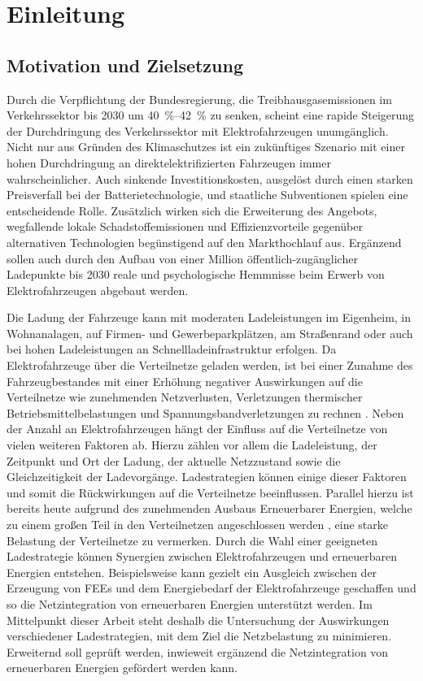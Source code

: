 \section{Einleitung}


\subsection{Motivation und Zielsetzung}

Durch die Verpflichtung der Bundesregierung, die Treibhausgasemissionen im Verkehrssektor bis \num{2030} um \SIrange[range-phrase=~bis~]{40}{42}{\percent} \cite{BundesministeriumUmwelt2019} zu senken, scheint eine rapide Steigerung der Durchdringung des Verkehrssektor mit Elektrofahrzeugen unumgänglich.
Nicht nur aus Gründen des Klimaschutzes ist ein zukünftiges Szenario mit einer hohen Durchdringung an direktelektrifizierten Fahrzeugen immer wahrscheinlicher.
Auch sinkende Investitionskosten, ausgelöst durch einen starken Preisverfall bei der Batterietechnologie, und staatliche Subventionen spielen eine entscheidende Rolle.
Zusätzlich wirken sich die Erweiterung des Angebots, wegfallende lokale Schadstoffemissionen und Effizienzvorteile gegenüber alternativen Technologien begünstigend auf den Markthochlauf aus.
Ergänzend sollen auch durch den Aufbau von einer Million öffentlich-zugänglicher Ladepunkte bis \num{2030} \cite{DieBundesregierung2019} reale und psychologische Hemmnisse beim Erwerb von Elektrofahrzeugen abgebaut werden.\medskip

Die Ladung der Fahrzeuge kann mit moderaten Ladeleistungen im Eigenheim, in Wohnanalagen, auf Firmen- und Gewerbeparkplätzen, am Straßenrand oder auch bei hohen Ladeleistungen an Schnellladeinfrastruktur erfolgen.
Da Elektrofahrzeuge über die Verteilnetze geladen werden, ist bei einer Zunahme des Fahrzeugbestandes mit einer Erhöhung negativer Auswirkungen auf die Verteilnetze wie zunehmenden Netzverlusten, Verletzungen thermischer Betriebsmittelbelastungen und Spannungsbandverletzungen zu rechnen \cite{Dharmakeerthi2011}.
Neben der Anzahl an Elektrofahrzeugen hängt der Einfluss auf die Verteilnetze von vielen weiteren Faktoren ab.
Hierzu zählen vor allem die Ladeleistung, der Zeitpunkt und Ort der Ladung, der aktuelle Netzzustand sowie die Gleichzeitigkeit der Ladevorgänge.
Ladestrategien können einige dieser Faktoren und somit die Rückwirkungen auf die Verteilnetze beeinflussen.
Parallel hierzu ist bereits heute aufgrund des zunehmenden Ausbaus Erneuerbarer Energien, welche zu einem großen Teil in den Verteilnetzen angeschlossen werden \cite{AgoraEnergiewende2017}, eine starke Belastung der Verteilnetze zu vermerken.
Durch die Wahl einer geeigneten Ladestrategie können Synergien zwischen Elektrofahrzeugen und erneuerbaren Energien entstehen.
Beispielsweise kann gezielt ein Ausgleich zwischen der Erzeugung von \glspl{FEE} und dem Energiebedarf der Elektrofahrzeuge geschaffen und so die Netzintegration von erneuerbaren Energien unterstützt werden.
Im Mittelpunkt dieser Arbeit steht deshalb die Untersuchung der Auswirkungen verschiedener Ladestrategien, mit dem Ziel die Netzbelastung zu minimieren.
Erweiternd soll geprüft werden, inwieweit ergänzend die Netzintegration von erneuerbaren Energien gefördert werden kann.\medskip

